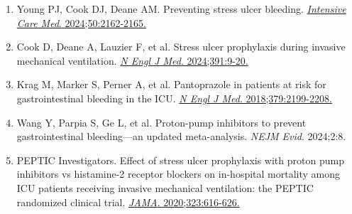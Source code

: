 \documentclass[12pt,a4paper]{article}
\begin{document}
\begin{enumerate}
    \item Young PJ, Cook DJ, Deane AM. Preventing stress ulcer bleeding. \href{https://doi.org/10.1007/s00134-024-07674-3}{\textit{Intensive Care Med}. 2024;50:2162-2165.}

    \item Cook D, Deane A, Lauzier F, et al. Stress ulcer prophylaxis during invasive mechanical ventilation. \href{https://doi.org/10.1056/NEJMoa2404245}{\textit{N Engl J Med}. 2024;391:9-20.}

    \item Krag M, Marker S, Perner A, et al. Pantoprazole in patients at risk for gastrointestinal bleeding in the ICU. \href{https://doi.org/10.1056/NEJMoa1714919}{\textit{N Engl J Med}. 2018;379:2199-2208.}

    \item Wang Y, Parpia S, Ge L, et al. Proton-pump inhibitors to prevent gastrointestinal bleeding—an updated meta-analysis. \textit{NEJM Evid}. 2024;2:8.

    \item PEPTIC Investigators. Effect of stress ulcer prophylaxis with proton pump inhibitors vs histamine-2 receptor blockers on in-hospital mortality among ICU patients receiving invasive mechanical ventilation: the PEPTIC randomized clinical trial. \href{https://doi.org/10.1001/jama.2019.22190}{\textit{JAMA}. 2020;323:616-626.}
\end{enumerate}
\end{document}
